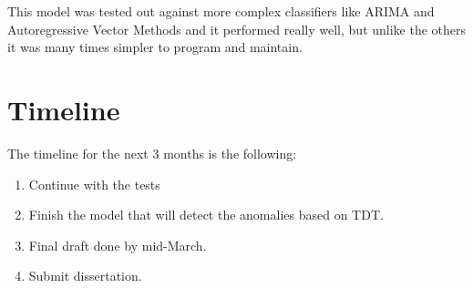\documentclass[minf,frontabs,twoside,singlespacing,parskip]{infthesis}
\begin{document}
This model was tested out against more complex classifiers like ARIMA and Autoregressive Vector Methods and it performed really well, but unlike the others it was many times simpler to program and maintain.


\chapter{Timeline}

The timeline for the next 3 months is the following:

\begin{enumerate}
\item Continue with the tests
\item Finish the model that will detect the anomalies based on TDT.
\item Final draft done by mid-March.
\item Submit dissertation.
\end{enumerate}




\end{document}
